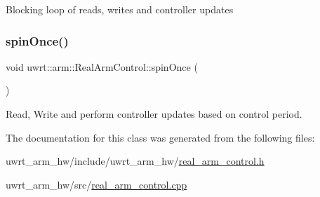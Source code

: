 Blocking loop of reads, writes and controller updates \mbox{\label{classuwrt_1_1arm_1_1_real_arm_control_aa6b49ca2736508e70b4b135c21f1cf51}} 
\subsubsection{\texorpdfstring{spin\+Once()}{spinOnce()}}
{\footnotesize\ttfamily void uwrt\+::arm\+::\+Real\+Arm\+Control\+::spin\+Once (\begin{DoxyParamCaption}{ }\end{DoxyParamCaption})}



Read, Write and perform controller updates based on control period. 



The documentation for this class was generated from the following files\+:\begin{DoxyCompactItemize}
\item 
uwrt\+\_\+arm\+\_\+hw/include/uwrt\+\_\+arm\+\_\+hw/\hyperlink{real__arm__control_8h}{real\+\_\+arm\+\_\+control.\+h}\item 
uwrt\+\_\+arm\+\_\+hw/src/\hyperlink{real__arm__control_8cpp}{real\+\_\+arm\+\_\+control.\+cpp}\end{DoxyCompactItemize}

